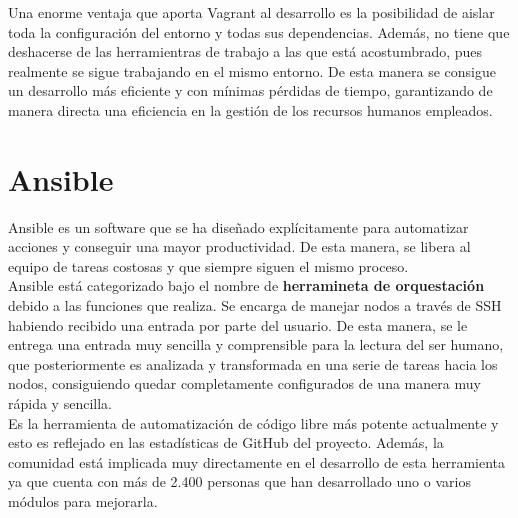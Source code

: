 Una enorme ventaja que aporta Vagrant al desarrollo es la posibilidad de aislar toda la configuración
del entorno y todas sus dependencias. Además, no tiene que deshacerse de las herramientras de trabajo
a las que está acostumbrado, pues realmente se sigue trabajando en el mismo entorno. 
De esta manera se consigue un desarrollo más eficiente y con mínimas pérdidas de tiempo, garantizando 
de manera directa una eficiencia en la gestión de los recursos humanos empleados.\\



\section{Ansible}

Ansible es un software que se ha diseñado explícitamente para automatizar acciones y
conseguir una mayor productividad. De esta manera, se libera al equipo de tareas costosas
y que siempre siguen el mismo proceso.\\

Ansible está categorizado bajo el nombre de \textbf{herramineta de orquestación} debido a 
las funciones que realiza. Se encarga de manejar nodos a través de SSH habiendo recibido
una entrada por parte del usuario. De esta manera, se le entrega una entrada muy sencilla
y comprensible para la lectura del ser humano, que posteriormente es analizada y transformada
en una serie de tareas hacia los nodos, consiguiendo quedar completamente configurados de una
manera muy rápida y sencilla.\\


Es la herramienta de automatización de código libre más potente actualmente y esto es reflejado
en las estadísticas de GitHub del proyecto. Además, la comunidad está implicada muy directamente
en el desarrollo de esta herramienta ya que cuenta con más de 2.400 personas que han desarrollado
uno o varios módulos para mejorarla.



